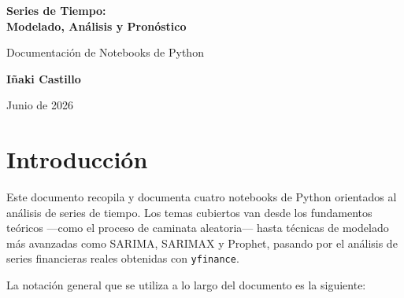 \documentclass[12pt, a4paper]{article}
\begin{document}
\begin{titlepage}
  \centering
  \vspace*{2cm}
  {\Huge\bfseries Series de Tiempo:\\[0.3em]
   \Large Modelado, Análisis y Pronóstico\par}
  \vspace{1.5cm}
  {\large Documentación de Notebooks de Python\par}
  \vspace{2cm}
  \vspace{2cm}

  {\Large\bfseries Iñaki Castillo\par}
  \vspace{0.5cm}
  {\large Junio de 2026\par}
  \vfill
\end{titlepage}

\tableofcontents
\newpage

\section{Introducción}

Este documento recopila y documenta cuatro notebooks de Python orientados al
análisis de series de tiempo. Los temas cubiertos van desde los fundamentos
teóricos —como el proceso de caminata aleatoria— hasta técnicas de modelado
más avanzadas como SARIMA, SARIMAX y Prophet, pasando por el análisis de
series financieras reales obtenidas con \texttt{yfinance}.

La notación general que se utiliza a lo largo del documento es la siguiente:
\end{document}
